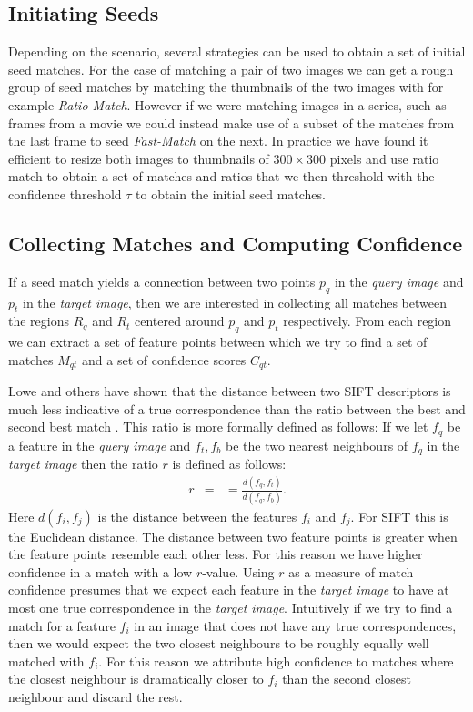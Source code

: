 \documentclass[runningheads]{llncs}
\begin{document}
\subsection{Initiating Seeds}
\label{seeds}
%
Depending on the scenario, several strategies can be used to obtain a set of initial seed matches. For the case of matching a pair of two images we can get a rough group of seed matches by matching the thumbnails of the two images with for example \emph{Ratio-Match}. However if we were matching images in a series, such as frames from a movie we could instead make use of a subset of the matches from the last frame to seed \emph{Fast-Match} on the next. In practice we have found it efficient to resize both images to thumbnails of $300\times 300$ pixels and use ratio match to obtain a set of matches and ratios that we then threshold with the confidence threshold $\tau$ to obtain the initial seed matches.

\subsection{Collecting Matches and Computing Confidence}
\label{collection}
%
If a seed match yields a connection between two points $p_q$ in the \emph{query image} and $p_t$ in the \emph{target image}, then we are interested in collecting all matches between the regions $R_q$ and $R_t$ centered around $p_q$ and $p_t$ respectively. From each region we can extract a set of feature points between which we try to find a set of matches $M_{qt} $ and a set of confidence scores $C_{qt}$.

Lowe and others have shown that the distance between two SIFT descriptors is much less indicative of a true correspondence than the ratio between the best and second best match \cite{lowe2004sift,mikolajczyk2005performance,moreels2007evaluation,rabin2009statistical}. This ratio is more formally defined as follows: If we let $f_q$ be a feature in the \emph{query image} and $f_t, f_b$ be the two nearest neighbours of $f_q$ in the \emph{target image} then the ratio $r$ is defined as follows:
\begin{align*}
    r &= %
        &= \frac{d(f_{q}, f_{t})}{d(f_{q}, f_{b})}.
\end{align*}
Here $d(f_i,f_j)$ is the distance between the features $f_i$ and $f_j$. For SIFT this is the Euclidean distance. The distance between two feature points is greater when the feature points resemble each other less. For this reason we have higher confidence in a match with a low $r$-value. Using $r$ as a measure of match confidence presumes that we expect each feature in the \emph{target image} to have at most one true correspondence in the \emph{target image}. Intuitively if we try to find a match for a feature $f_i$ in an image that does not have any true correspondences, then we would expect the two closest neighbours to be roughly equally well matched with $f_i$. For this reason we attribute high confidence to matches where the closest neighbour is dramatically closer to $f_i$ than the second closest neighbour and discard the rest.
\end{document}

